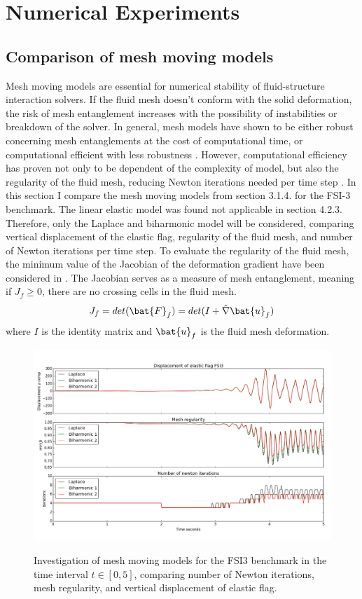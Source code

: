  \chapter{Numerical Experiments}
\section{Comparison of mesh moving models}
Mesh moving models are essential for numerical stability of fluid-structure interaction solvers. If the fluid mesh doesn't conform with the solid deformation, the risk of mesh entanglement increases with the possibility of instabilities or breakdown of the solver. In general, mesh models have shown to be either robust concerning mesh entanglements at the cost of computational time, or computational efficient with less robustness \cite{MM2016}. However, computational efficiency has proven not only to be dependent of the complexity of model, but also the regularity of the fluid mesh, reducing Newton iterations needed per time step \cite{Wickb}. In this section I compare the mesh moving models from section 3.1.4. for the FSI-3 benchmark. The linear elastic model was found not applicable in section 4.2.3. Therefore, only the Laplace and biharmonic model will be considered, comparing vertical displacement of the elastic flag, regularity of the fluid mesh, and number of Newton iterations per time step. To evaluate the regularity of the fluid mesh, the minimum value of the Jacobian of the deformation gradient have been considered in \cite{Wickb}. The Jacobian serves as a measure of mesh entanglement, meaning if $J_f \geq 0$, there are no crossing cells in the fluid mesh. 
\begin{align*}
{J}_f = det(\bat{F}_f) =  det(I + \hat{\nabla} \bat{u}_f)
\end{align*}
where $I$ is the identity matrix and $ \bat{u}_f$ is the fluid mesh deformation.  
\newpage
\begin{figure}[h!]
        \centering
    \includegraphics[scale=0.4]{./Fig/minjcompare.png} \\
      \caption{Investigation of mesh moving models for the FSI3 benchmark in the time interval $t \in [0, 5]$, comparing number of Newton iterations, mesh regularity, and vertical displacement of elastic flag. }
      \label{fig:minjcomp}
\end{figure}
